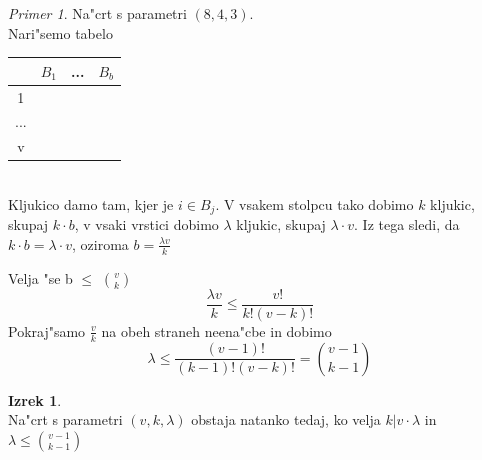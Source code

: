 \documentclass[a4paper,12pt]{article}
\theoremstyle{definition}
\newtheorem{theorem}[counter]{Izrek}
\theoremstyle{remark}
\newtheorem*{ex}{Primer}
\begin{document}
\begin{ex}
	Na"crt s parametri $(8, 4, 3)$.\\
	Nari"semo tabelo
	\begin{tabular}{c|c c c}
		& $B_1$ & ... & $B_b$ \\
		\hline
		1 \\
		...\\
		v
	\end{tabular}\\
	Kljukico damo tam, kjer je $i \in B_j$. V vsakem stolpcu tako dobimo $k$ kljukic, skupaj $k\cdot b$, v vsaki vrstici dobimo $\lambda$ kljukic, skupaj $\lambda \cdot v$. Iz tega sledi, da $k \cdot b = \lambda \cdot v$, oziroma $b = \frac{\lambda v}{k}$

	Velja "se b $\leqslant$ $\binom{v}{k}$
	\[\frac{\lambda v}{k} \leqslant \frac{v!}{k! (v-k)!}\]
	Pokraj"samo $\frac{v}{k}$ na obeh straneh neena"cbe in dobimo
	\[\lambda \leqslant \frac{(v - 1)!}{(k - 1)! (v - k)!} = \binom{v-1}{k-1}\]
\end{ex}

\begin{theorem}\mbox{}\\
	Na"crt s parametri $(v, k, \lambda)$ obstaja natanko tedaj, ko velja $k | v\cdot \lambda$ in $\lambda \leqslant \binom{v - 1}{k - 1}$
\end{theorem}
\end{document}
